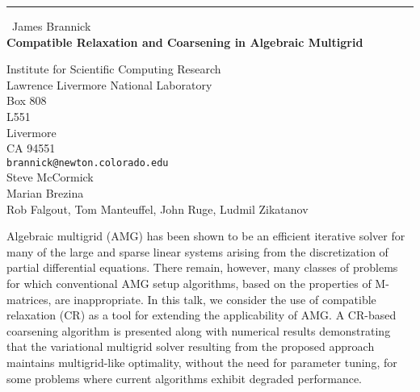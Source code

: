 \documentclass{report}
\begin{document}
\begin{center}
\rule{6in}{1pt} \
{\large James Brannick \\
{\bf Compatible Relaxation and Coarsening in Algebraic Multigrid}}

Institute for Scientific Computing Research \\ Lawrence Livermore National Laboratory \\ Box 808 \\ L551 \\ Livermore \\ CA 94551
\\
{\tt brannick@newton.colorado.edu}\\
Steve McCormick\\
Marian Brezina\\
	Rob Falgout, Tom Manteuffel, John Ruge, Ludmil Zikatanov\end{center}

Algebraic multigrid (AMG) has been shown to be an efficient iterative
solver for many of the large and sparse linear systems arising from the
discretization of partial differential equations. There remain, however,
many classes of problems for which conventional AMG setup algorithms,
based on the properties of
M-matrices, are inappropriate. In this talk, we consider the use of
compatible relaxation (CR) as a tool for extending the applicability of
AMG. A CR-based coarsening algorithm is presented along with numerical
results demonstrating that the variational multigrid solver resulting
from the proposed approach maintains multigrid-like optimality, without
the need for parameter tuning, for some problems where current algorithms
exhibit degraded performance.
\end{document}
